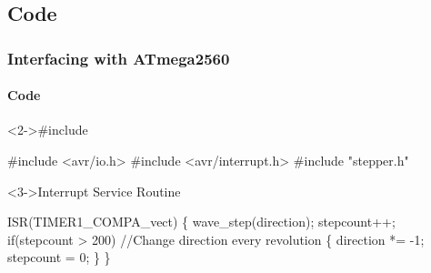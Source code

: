 \documentclass[table,10pt,red]{beamer}	%
\begin{document}
\subsection{Code}
\begin{frame}[shrink = 2,fragile]
	\frametitle{Interfacing with ATmega2560}
	\framesubtitle{Code}
	\pause
	\begin{block}<2->{\#include}
		\begin{semiverbatim}
			\scriptsize{
\#include <avr/io.h>
\#include <avr/interrupt.h>
\#include "stepper.h"
			}
		\end{semiverbatim}
	\end{block}
	\begin{block}<3->{Interrupt Service Routine}
		\begin{semiverbatim}
			\scriptsize{
ISR(TIMER1\_COMPA\_vect)
\{
    wave\_step(direction);
    stepcount++;
    if(stepcount > 200) \color{comment}//Change direction every revolution\color{black}
    \{
        direction *= -1;
        stepcount = 0;
    \}
\}
			}
		\end{semiverbatim}
	\end{block}
\end{frame}
\end{document}
